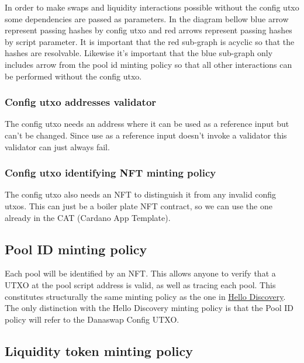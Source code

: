 \documentclass{article}
\begin{document}
In order to make swaps and liquidity interactions possible without
the config utxo some dependencies are passed as parameters.
In the diagram bellow blue arrow represent passing hashes by
config utxo and red arrows represent passing hashes by script parameter.
It is important that the red sub-graph is acyclic so that
the hashes are resolvable. Likewise it's important that
the blue sub-graph only includes arrow from the pool id minting policy
so that all other interactions can be performed without the config utxo.


\subsubsection{Config utxo addresses validator}

The config utxo needs an address where it can be used as a reference
input but can't be changed. Since use as a reference input doesn't
invoke a validator this validator can just always fail.

\subsubsection{Config utxo identifying NFT minting policy}

The config utxo also needs an NFT to distinguish it from any
invalid config utxos. This can just be a boiler plate NFT contract,
so we can use the one already in the CAT (Cardano App Template).

\subsection{Pool ID minting policy}

Each pool will be identified by an NFT. This allows anyone to verify that a UTXO
at the pool script address is valid, as well as tracing each pool. This
constitutes structurally the same minting policy as the one in
\href{https://github.com/ArdanaLabs/cardano-app-template/blob/master/onchain/src/HelloDiscovery.hs}{
  Hello Discovery}.
The only distinction with the Hello Discovery minting policy is that the Pool ID
policy will refer to the Danaswap Config UTXO.

\subsection{Liquidity token minting policy}
\end{document}
